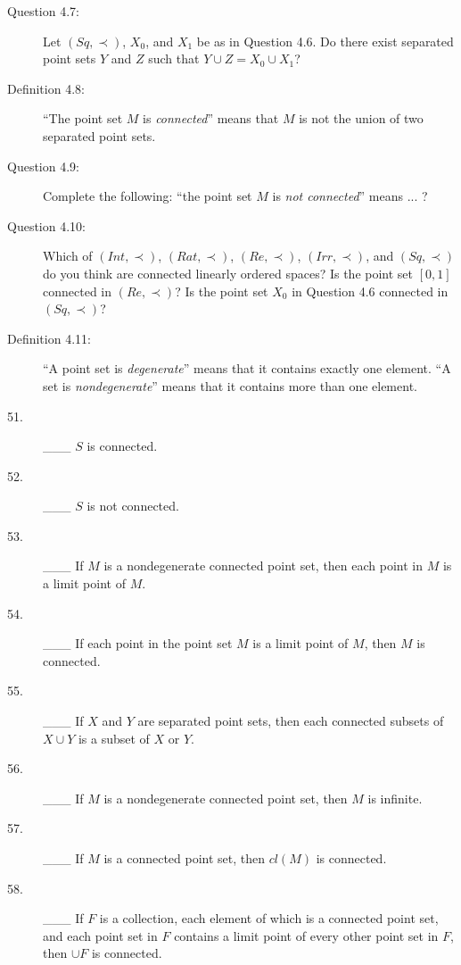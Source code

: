\documentclass{book}
\begin{document}
\begin{description}
\item[Question 4.7:] Let $(Sq, \prec)$, $X_{0}$, and $X_{1}$ be as in Question 4.6. Do there exist separated point sets $Y$ and $Z$ such that $Y \cup Z = X_{0} \cup X_{1}$?

\item[Definition 4.8:] ``The point set $M$ is \emph{connected}'' means that $M$ is not the union of two separated point sets.

\item[Question 4.9:] Complete the following: ``the point set $M$ is \emph{not connected}'' means ... ?

\item[Question 4.10:] Which of $(Int, \prec)$, $(Rat, \prec)$, $(Re, \prec)$, $(Irr, \prec)$, and $(Sq, \prec)$ do you think are connected linearly ordered spaces? Is the point set $[0,1]$ connected in $(Re, \prec)$? Is the point set $X_{0}$ in Question 4.6 connected in $(Sq, \prec)$?

\item[Definition 4.11:] ``A point set is \emph{degenerate}'' means that it contains exactly one element. ``A set is \emph{nondegenerate}'' means that it contains more than one element.

\item[51.] \_\_\_ $S$ is connected.

\item[52.] \_\_\_ $S$ is not connected.

\item[53.] \_\_\_ If $M$ is a nondegenerate connected point set, then each point in $M$ is a limit point of $M$.

\item[54.] \_\_\_ If each point in the point set $M$ is a limit point of $M$, then $M$ is connected.

\item[55.] \_\_\_ If $X$ and $Y$ are separated point sets, then each connected subsets of $X \cup Y$ is a subset of $X$ or $Y$.

\item[56.] \_\_\_ If $M$ is a nondegenerate connected point set, then $M$ is infinite.

\item[57.] \_\_\_ If $M$ is a connected point set, then $cl(M)$ is connected.

\item[58.] \_\_\_ If $F$ is a collection, each element of which is a connected point set, and each point set in $F$ contains a limit point of every other point set in $F$, then $\cup F$ is connected.


\end{description}
\end{document}
